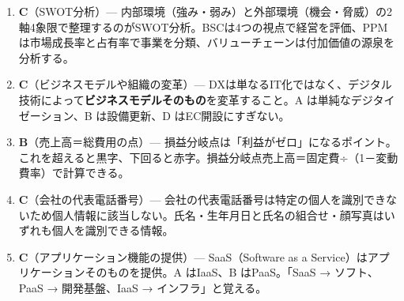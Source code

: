 \begin{enumerate}
  \item \textbf{C}（SWOT分析）— 内部環境（強み・弱み）と外部環境（機会・脅威）の2軸4象限で整理するのがSWOT分析。BSCは4つの視点で経営を評価、PPMは市場成長率と占有率で事業を分類、バリューチェーンは付加価値の源泉を分析する。
  \item \textbf{C}（ビジネスモデルや組織の変革）— DXは単なるIT化ではなく、デジタル技術によって\textbf{ビジネスモデルそのもの}を変革すること。A は単純なデジタイゼーション、B は設備更新、D はEC開設にすぎない。
  \item \textbf{B}（売上高＝総費用の点）— 損益分岐点は「利益がゼロ」になるポイント。これを超えると黒字、下回ると赤字。損益分岐点売上高＝固定費÷（1－変動費率）で計算できる。
  \item \textbf{C}（会社の代表電話番号）— 会社の代表電話番号は特定の個人を識別できないため個人情報に該当しない。氏名・生年月日と氏名の組合せ・顔写真はいずれも個人を識別できる情報。
  \item \textbf{C}（アプリケーション機能の提供）— SaaS（Software as a Service）はアプリケーションそのものを提供。A はIaaS、B はPaaS。「SaaS → ソフト、PaaS → 開発基盤、IaaS → インフラ」と覚える。
\end{enumerate}

